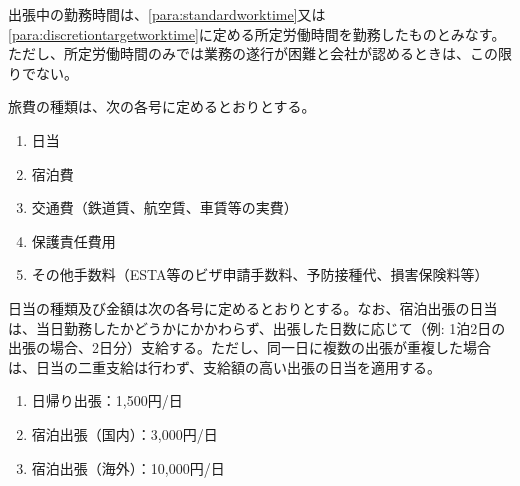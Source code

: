 \documentclass[10pt,a4paper,uplatex]{jsarticle}
\begin{document}
出張中の勤務時間は、\ref{para:standardworktime}又は\ref{para:discretiontargetworktime}に定める所定労働時間を勤務したものとみなす。ただし、所定労働時間のみでは業務の遂行が困難と会社が認めるときは、この限りでない。

旅費の種類は、次の各号に定めるとおりとする。
\begin{enumerate}
    \item 日当
    \item 宿泊費
    \item 交通費（鉄道賃、航空賃、車賃等の実費）
    \item 保護責任費用
    \item その他手数料（ESTA等のビザ申請手数料、予防接種代、損害保険料等）
\end{enumerate}

日当の種類及び金額は次の各号に定めるとおりとする。なお、宿泊出張の日当は、当日勤務したかどうかにかかわらず、出張した日数に応じて（例: 1泊2日の出張の場合、2日分）支給する。ただし、同一日に複数の出張が重複した場合は、日当の二重支給は行わず、支給額の高い出張の日当を適用する。
\begin{enumerate}
    \item 日帰り出張：1,500円/日
    \item 宿泊出張（国内）：3,000円/日
    \item 宿泊出張（海外）：10,000円/日
\end{enumerate}
\end{document}
